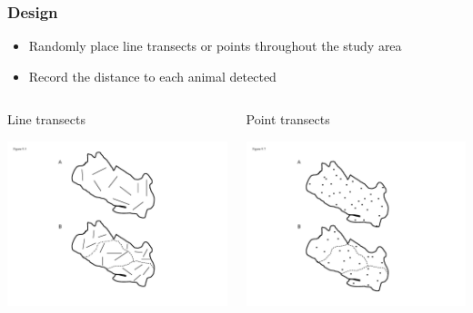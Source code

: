 \documentclass[color=usenames,dvipsnames,handout]{beamer}\usepackage[]{graphicx}\usepackage[]{xcolor}
\begin{document}
\begin{frame}
  \frametitle{Design}
  \Large
  \begin{itemize}%
    \item Randomly place line transects or points throughout the study
      area
    \item Record the distance to each animal detected
  \end{itemize}
  \vspace{0.5cm}
  \begin{columns}
    \begin{column}{0.5\textwidth}
      {\centering Line transects \par}
      \includegraphics[width=\textwidth]{figs/Fig9-7}
    \end{column}
    \begin{column}{0.5\textwidth}
      {\centering Point transects \par}
      \includegraphics[width=\textwidth]{figs/Fig9-9}
    \end{column}
  \end{columns}
\end{frame}
\end{document}
